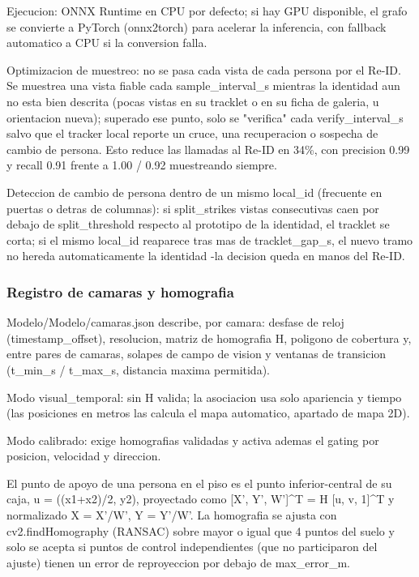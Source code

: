 \documentclass[12pt,letterpaper]{article}
\begin{document}
Ejecucion: ONNX Runtime en CPU por defecto; si hay GPU disponible, el grafo se convierte a PyTorch (onnx2torch) para acelerar la inferencia, con fallback automatico a CPU si la conversion falla.


Optimizacion de muestreo: no se pasa cada vista de cada persona por el Re-ID. Se muestrea una vista fiable cada sample\_interval\_s mientras la identidad aun no esta bien descrita (pocas vistas en su tracklet o en su ficha de galeria, u orientacion nueva); superado ese punto, solo se "verifica" cada verify\_interval\_s salvo que el tracker local reporte un cruce, una recuperacion o sospecha de cambio de persona. Esto reduce las llamadas al Re-ID en 34\%, con precision 0.99 y recall 0.91 frente a 1.00 / 0.92 muestreando siempre.


Deteccion de cambio de persona dentro de un mismo local\_id (frecuente en puertas o detras de columnas): si split\_strikes vistas consecutivas caen por debajo de split\_threshold respecto al prototipo de la identidad, el tracklet se corta; si el mismo local\_id reaparece tras mas de tracklet\_gap\_s, el nuevo tramo no hereda automaticamente la identidad -la decision queda en manos del Re-ID.


\subsubsection{Registro de camaras y homografia}

Modelo/Modelo/camaras.json describe, por camara: desfase de reloj (timestamp\_offset), resolucion, matriz de homografia H, poligono de cobertura y, entre pares de camaras, solapes de campo de vision y ventanas de transicion (t\_min\_s / t\_max\_s, distancia maxima permitida).


Modo visual\_temporal: sin H valida; la asociacion usa solo apariencia y tiempo (las posiciones en metros las calcula el mapa automatico, apartado de mapa 2D).


Modo calibrado: exige homografias validadas y activa ademas el gating por posicion, velocidad y direccion.


El punto de apoyo de una persona en el piso es el punto inferior-central de su caja, u = ((x1+x2)/2, y2), proyectado como [X', Y', W']\textasciicircum{}T = H [u, v, 1]\textasciicircum{}T y normalizado X = X'/W', Y = Y'/W'. La homografia se ajusta con cv2.findHomography (RANSAC) sobre  mayor o igual que  4 puntos del suelo y solo se acepta si puntos de control independientes (que no participaron del ajuste) tienen un error de reproyeccion por debajo de max\_error\_m.
\end{document}
